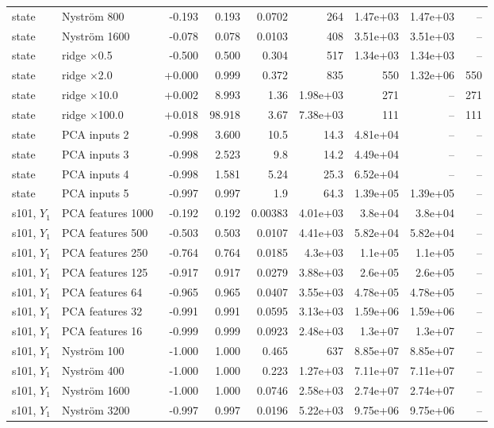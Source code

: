 \begin{landscape}
{\begin{longtable}{llrrrrrrr}
state & Nystr\"om 800 & -0.193 & 0.193 & 0.0702 & 264 & 1.47e+03 & 1.47e+03 & -- \\
state & Nystr\"om 1600 & -0.078 & 0.078 & 0.0103 & 408 & 3.51e+03 & 3.51e+03 & -- \\
state & ridge $\times$0.5 & -0.500 & 0.500 & 0.304 & 517 & 1.34e+03 & 1.34e+03 & -- \\
state & ridge $\times$2.0 & +0.000 & 0.999 & 0.372 & 835 & 550 & 1.32e+06 & 550 \\
state & ridge $\times$10.0 & +0.002 & 8.993 & 1.36 & 1.98e+03 & 271 & -- & 271 \\
state & ridge $\times$100.0 & +0.018 & 98.918 & 3.67 & 7.38e+03 & 111 & -- & 111 \\
state & PCA inputs 2 & -0.998 & 3.600 & 10.5 & 14.3 & 4.81e+04 & -- & -- \\
state & PCA inputs 3 & -0.998 & 2.523 & 9.8 & 14.2 & 4.49e+04 & -- & -- \\
state & PCA inputs 4 & -0.998 & 1.581 & 5.24 & 25.3 & 6.52e+04 & -- & -- \\
state & PCA inputs 5 & -0.997 & 0.997 & 1.9 & 64.3 & 1.39e+05 & 1.39e+05 & -- \\
s101, $Y_1$ & PCA features 1000 & -0.192 & 0.192 & 0.00383 & 4.01e+03 & 3.8e+04 & 3.8e+04 & -- \\
s101, $Y_1$ & PCA features 500 & -0.503 & 0.503 & 0.0107 & 4.41e+03 & 5.82e+04 & 5.82e+04 & -- \\
s101, $Y_1$ & PCA features 250 & -0.764 & 0.764 & 0.0185 & 4.3e+03 & 1.1e+05 & 1.1e+05 & -- \\
s101, $Y_1$ & PCA features 125 & -0.917 & 0.917 & 0.0279 & 3.88e+03 & 2.6e+05 & 2.6e+05 & -- \\
s101, $Y_1$ & PCA features 64 & -0.965 & 0.965 & 0.0407 & 3.55e+03 & 4.78e+05 & 4.78e+05 & -- \\
s101, $Y_1$ & PCA features 32 & -0.991 & 0.991 & 0.0595 & 3.13e+03 & 1.59e+06 & 1.59e+06 & -- \\
s101, $Y_1$ & PCA features 16 & -0.999 & 0.999 & 0.0923 & 2.48e+03 & 1.3e+07 & 1.3e+07 & -- \\
s101, $Y_1$ & Nystr\"om 100 & -1.000 & 1.000 & 0.465 & 637 & 8.85e+07 & 8.85e+07 & -- \\
s101, $Y_1$ & Nystr\"om 400 & -1.000 & 1.000 & 0.223 & 1.27e+03 & 7.11e+07 & 7.11e+07 & -- \\
s101, $Y_1$ & Nystr\"om 1600 & -1.000 & 1.000 & 0.0746 & 2.58e+03 & 2.74e+07 & 2.74e+07 & -- \\
s101, $Y_1$ & Nystr\"om 3200 & -0.997 & 0.997 & 0.0196 & 5.22e+03 & 9.75e+06 & 9.75e+06 & -- \\

\end{longtable}}
\end{landscape}
